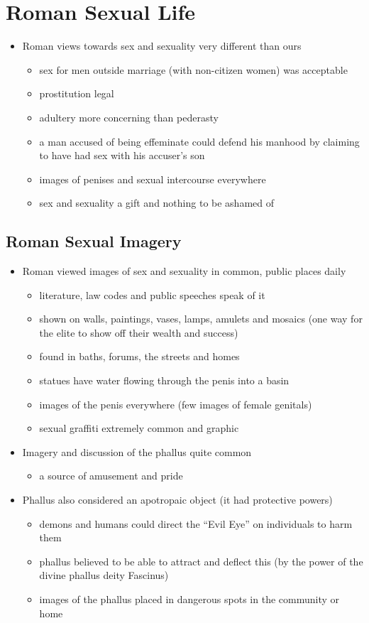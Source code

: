 \documentclass[12pt, twoside]{article}
\begin{document}
\section{Roman Sexual Life}
\begin{itemize}
\item Roman views towards sex and sexuality very different than ours
	\begin{itemize}
	\item sex for men outside marriage (with non-citizen women) was acceptable
	\item prostitution legal
	\item adultery more concerning than pederasty
	\item a man accused of being effeminate could defend his manhood by claiming to have had sex with his accuser’s son
	\item images of penises and sexual intercourse everywhere
	\item sex and sexuality a gift and nothing to be ashamed of
	\end{itemize}
\end{itemize}

\subsection{Roman Sexual Imagery}
\begin{itemize}
\item Roman viewed images of sex and sexuality in common, public places daily
	\begin{itemize}
	\item literature, law codes and public speeches speak of it
	\item shown on walls, paintings, vases, lamps, amulets and mosaics (one way for the elite to show off their wealth and success)
	\item found in baths, forums, the streets and homes
	\item statues have water flowing through the penis into a basin
	\item images of the penis everywhere (few images of female genitals)
	\item sexual graffiti extremely common and graphic
	\end{itemize}
\item Imagery and discussion of the phallus quite common
	\begin{itemize}
	\item a source of amusement and pride
	\end{itemize}
\item Phallus also considered an apotropaic object (it had protective powers)
	\begin{itemize}
	\item demons and humans could direct the “Evil Eye” on individuals to harm them
	\item phallus believed to be able to attract and deflect this (by the power of the divine phallus deity Fascinus)
	\item images of the phallus placed in dangerous spots in the community or home
	\end{itemize}
\end{itemize}
\end{document}
